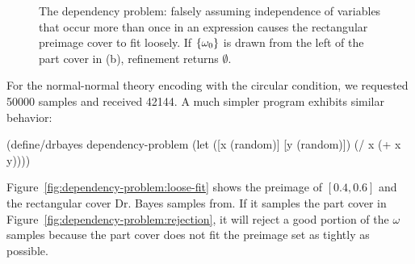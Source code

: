 \begin{figure}[tb!]
{}%
\tab%
%
\caption[The dependency problem]{The dependency problem: falsely assuming independence of variables that occur more than once in an expression causes the rectangular preimage cover to fit loosely.
If $\{{\omega_0}\}$ is drawn from the left of the part cover in (b), refinement returns $\emptyset$.}
\label{fig:dependency-problem}
\end{figure}

For the normal-normal theory encoding with the circular condition, we requested 50000 samples and received 42144.
A much simpler program exhibits similar behavior:
\begin{center}\singlespacing
\begin{schemedisplay}
(define/drbayes dependency-problem
  (let ([x  (random)]
        [y  (random)])
    (/ x (+ x y))))
\end{schemedisplay}
\end{center}
Figure~\ref{fig:dependency-problem:loose-fit} shows the preimage of $[0.4,0.6]$ and the rectangular cover Dr. Bayes samples from.
If it samples the part cover in Figure~\ref{fig:dependency-problem:rejection}, it will reject a good portion of the $\omega$ samples because the part cover does not fit the preimage set as tightly as possible.

